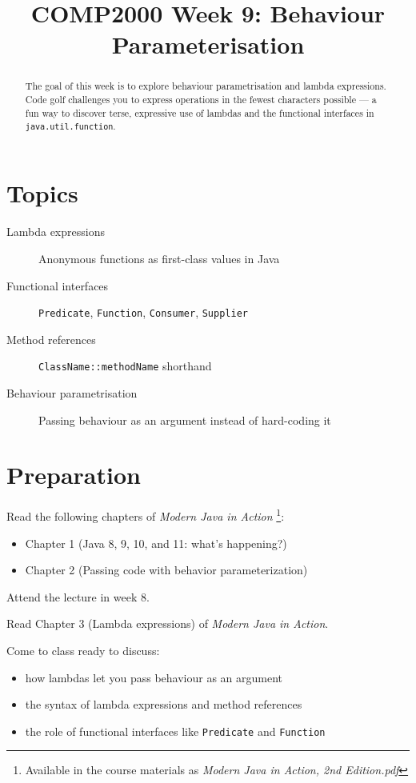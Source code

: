 \documentclass[twoside=false,DIV=14]{scrartcl}
\title{\color{redish} \vspace{-1em}COMP2000 Week 9: Behaviour Parameterisation}
\begin{document}
{\color{blackish}\maketitle}\vspace{-7em}

\begin{abstract}
The goal of this week is to explore behaviour parametrisation and lambda expressions.  Code golf challenges you to express operations in the fewest characters possible --- a fun way to discover terse, expressive use of lambdas and the functional interfaces in \texttt{java.util.function}.
\end{abstract}

\section*{Topics}
\begin{description}
\item[Lambda expressions] Anonymous functions as first-class values in Java
\item[Functional interfaces] \texttt{Predicate}, \texttt{Function}, \texttt{Consumer}, \texttt{Supplier}
\item[Method references] \texttt{ClassName::methodName} shorthand
\item[Behaviour parametrisation] Passing behaviour as an argument instead of hard-coding it
\end{description}

\section*{Preparation}
Read the following chapters of \textit{Modern Java in Action}
\footnote{Available in the course materials as \textit{Modern Java in Action, 2nd Edition.pdf}}:
\begin{itemize}
    \item Chapter 1 (Java 8, 9, 10, and 11: what's happening?)
    \item Chapter 2 (Passing code with behavior parameterization)
\end{itemize}

Attend the lecture in week 8.

Read Chapter 3 (Lambda expressions) of \textit{Modern Java in Action}.

Come to class ready to discuss:
\begin{itemize}
    \item how lambdas let you pass behaviour as an argument
    \item the syntax of lambda expressions and method references
    \item the role of functional interfaces like \texttt{Predicate} and \texttt{Function}
\end{itemize}
\end{document}
